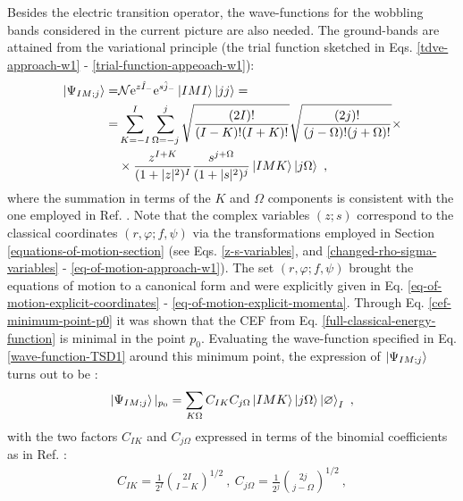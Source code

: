 Besides the electric transition operator, the wave-functions for the wobbling bands considered in the current picture are also needed. The ground-bands are attained from the variational principle (the trial function sketched in Eqs. \ref{tdve-approach-w1} - \ref{trial-function-appeoach-w1}):
\begin{align}
    \ket{\Psi_{IM;j}}=&\mathcal{N}\mathrm{e}^{z\hat{I}_-}\mathrm{e}^{s\hat{j}_-}\ket{IMI}\ket{jj}=\nonumber\\
    =&\sum_{K=-I}^I\sum_{\Omega=-j}^j\sqrt{\frac{(2I)!}{(I-K)!(I+K)!}}\sqrt{\frac{(2j)!}{(j-\Omega)!(j+\Omega)!}}\times\nonumber\\
    &\times\frac{z^{I+K}}{(1+|z|^2)^I}\frac{s^{j+\Omega}}{(1+|s|^2)^j}\ket{IMK}\ket{j\Omega}\ ,
    \label{wave-function-TSD1}
\end{align}
where the summation in terms of the $K$ and $\Omega$ components is consistent with the one employed in Ref. \cite{budaca2018semiclassical}. Note that the complex variables $(z;s)$ correspond to the classical coordinates $(r,\varphi;f,\psi)$ via the transformations employed in Section \ref{equations-of-motion-section} (see Eqs. \ref{z-s-variables}, and \ref{changed-rho-sigma-variables} - \ref{eq-of-motion-approach-w1}). The set $(r,\varphi;f,\psi)$ brought the equations of motion to a canonical form and were explicitly given in Eq. \ref{eq-of-motion-explicit-coordinates} - \ref{eq-of-motion-explicit-momenta}. Through Eq. \ref{cef-minimum-point-p0} it was shown that the CEF from Eq. \ref{full-classical-energy-function} is minimal in the point $p_0$. Evaluating the wave-function specified in Eq. \ref{wave-function-TSD1} around this minimum point, the expression of $\ket{\Psi_{IM;j}}$ turns out to be \cite{raduta2020approach,raduta2020towards}:
\begin{align}
    \ket{\Psi_{IM;j}}|_{p_0}=\sum_{K\Omega}C_{IK}C_{j\Omega}\ket{IMK}\ket{j\Omega}\ket{\varnothing}_I\ ,
    \label{wave-function-TSD1-p0}
\end{align}
with the two factors $C_{IK}$ and $C_{j\Omega}$ expressed in terms of the binomial coefficients as in Ref. \cite{raduta2017semiclassical}:
\begin{align}
    C_{IK}=\frac{1}{2^I}\binom{2I}{I-K}^{1/2}\ ,\ C_{j\Omega}=\frac{1}{2^j}\binom{2j}{j-\Omega}^{1/2}\ ,
    \label{CIK-binomial-coefficient}
\end{align}
